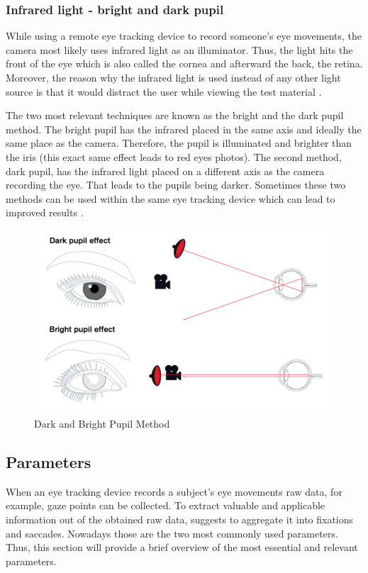 \subsubsection{Infrared light - bright and dark pupil}
While using a remote eye tracking device to record someone's eye movements, the camera most likely uses infrared light as an illuminator. Thus, the light hits the front of the eye which is also called the cornea and afterward the back, the retina. 
Moreover, the reason why the infrared light is used instead of any other light source is that it would distract the user while viewing the test material \autocite[]{poole2006eye, biedert2010eyebook}.

The two most relevant techniques are known as the bright and the dark pupil method. The bright pupil has the infrared placed in the same axis and ideally the same place as the camera. Therefore, the pupil is illuminated and brighter than the iris (this exact same effect leads to red eyes photos). The second method, dark pupil, has the infrared light placed on a different axis as the camera recording the eye. That leads to the pupils being darker. 
Sometimes these two methods can be used within the same eye tracking device which can lead to improved results \autocite[]{tobii2018dark, goldberg2002eye}.

\begin{figure}[!ht]
	\centering
	\includegraphics[width=0.75\linewidth]{images/DarkBright.png}
	\caption{
		Dark and Bright Pupil Method
	}
	\label{figure:DarkBright}
\end{figure}

\subsection{Parameters}
\label{subsection:Parameters}
When an eye tracking device records a subject's eye movements raw data, for example, gaze points can be collected. To extract valuable and applicable information out of the obtained raw data, \textcite[]{blascheck2014state}  suggests to aggregate it into fixations and saccades. 
Nowadays those are the two most commonly used parameters.
Thus, this section will provide a brief overview of the most essential and relevant parameters.

